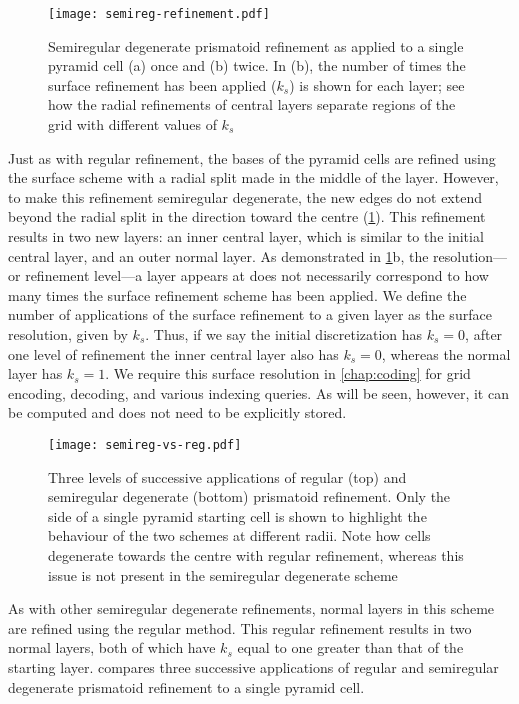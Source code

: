 \begin{figure}[ht!]
	\centering
	\texttt{[image: semireg-refinement.pdf]}
	\caption[Semiregular degenerate prismatoid refinement]{
		Semiregular degenerate prismatoid refinement as applied to a single pyramid cell (a) once and (b) twice.
		In (b), the number of times the surface refinement has been applied ($k_s$) is shown for each layer; see how the radial refinements of central layers separate regions of the grid with different values of $k_s$}
	\label{fig:semiregular}
\end{figure}


Just as with regular refinement, the bases of the pyramid cells are refined using the surface scheme with a radial split made in the middle of the layer.
However, to make this refinement semiregular degenerate, the new edges do not extend beyond the radial split in the direction toward the centre (\cref{fig:semiregular}).
This refinement results in two new layers: an inner central layer, which is similar to the initial central layer, and an outer normal layer.
As demonstrated in \cref{fig:semiregular}b, the resolution---or refinement level---a layer appears at does not necessarily correspond to how many times the surface refinement scheme has been applied.
We define the number of applications of the surface refinement to a given layer as the surface resolution, given by $k_s$.
Thus, if we say the initial discretization has $k_s = 0$, after one level of refinement the inner central layer also has $k_s = 0$, whereas the normal layer has $k_s = 1$.
We require this surface resolution in \cref{chap:coding} for grid encoding, decoding, and various indexing queries. As will be seen, however, it can be computed and does not need to be explicitly stored.


\begin{figure}[ht!]
	\centering
	\texttt{[image: semireg-vs-reg.pdf]}
	\caption[Comparison of regular and semiregular degenerate prismatoid refinement]{
		Three levels of successive applications of regular (top) and semiregular degenerate (bottom) prismatoid refinement.
		Only the side of a single pyramid starting cell is shown to highlight the behaviour of the two schemes at different radii.
		Note how cells degenerate towards the centre with regular refinement, whereas this issue is not present in the semiregular degenerate scheme
	}
	\label{fig:semireg-vs-reg}
\end{figure}


As with other semiregular degenerate refinements, normal layers in this scheme are refined using the regular method.
This regular refinement results in two normal layers, both of which have $k_s$ equal to one greater than that of the starting layer.
 compares three successive applications of regular and semiregular degenerate prismatoid refinement to a single pyramid cell.



